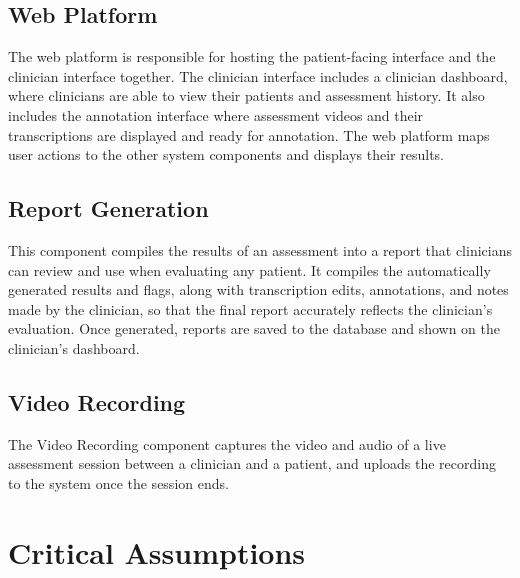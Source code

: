 \documentclass{article}
\begin{document}
\subsection{Web Platform}
The web platform is responsible for hosting the patient-facing interface and the clinician interface together. The clinician interface includes a clinician dashboard, where clinicians are able to view their patients and assessment history.  It also includes the annotation interface where assessment videos and their transcriptions are displayed and ready for annotation. The web platform maps user actions to the other system components and displays their results.

\subsection{Report Generation}
This component compiles the results of an assessment into a report that
clinicians can review and use when evaluating any patient. It compiles the
automatically generated results and flags, along with transcription edits, annotations,
and notes made by the clinician, so that the final report accurately reflects the clinician's evaluation. 
Once generated, reports are saved to the database and shown on the
clinician's dashboard.

\subsection{Video Recording}
The Video Recording component captures the video and audio of a live assessment session between a clinician and a patient, and uploads the recording to the system once the session ends.


\section{Critical Assumptions} \label{sec:Assumptions}
\end{document}
